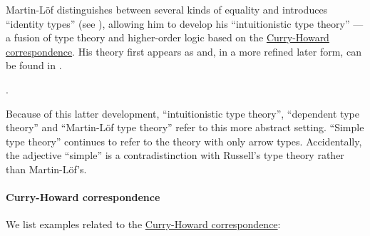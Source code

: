 \begin{definition}\label{def:product_type}
\end{definition}

\begin{definition}\label{def:sum_type}
\end{definition}

\begin{concept}\label{con:identity_types}

  Martin-L\"of distinguishes between several kinds of equality and introduces \enquote{identity types} (see ), allowing him to develop his \enquote{intuitionistic type theory} --- a fusion of type theory and higher-order logic based on the \hyperref[con:curry_howard_correspondence]{Curry-Howard correspondence}. His theory first appears as \cite{MartinLöf1975IntuitionisticTypeTheory} and, in a more refined later form, can be found in \cite{MartinLöf1984IntuitionisticTypeTheory}.
\end{concept}

\begin{concept}\label{con:homotopy_type_theory}
\end{concept}

\begin{concept}\label{con:dependent_types}

  .
\end{concept}

\begin{remark}\label{rem:dependent_type_theory}
  Because of this latter development, \enquote{intuitionistic type theory}, \enquote{dependent type theory} and \enquote{Martin-L\"of type theory} refer to this more abstract setting. \enquote{Simple type theory} continues to refer to the theory with only arrow types. Accidentally, the adjective \enquote{simple} is a contradistinction with Russell's type theory rather than Martin-L\"of's.
\end{remark}

\paragraph{Curry-Howard correspondence}\hfill

\begin{example}\label{ex:con:curry_howard_correspondence}
  We list examples related to the \hyperref[con:curry_howard_correspondence]{Curry-Howard correspondence}:
  \begin{thmenum}
  \end{thmenum}
\end{example}

\begin{algorithm}\label{alg:type_derivation_to_proof_tree}
\end{algorithm}

\begin{algorithm}\label{alg:proof_tree_to_type_derivation}
\end{algorithm}
